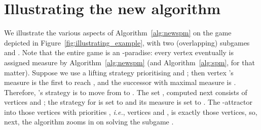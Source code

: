 \documentclass{eptcs}
\newcommand{\ie}{\emph{i.e.}\xspace}
\begin{document}
\section{Illustrating the new algorithm}
We illustrate the various aspects of Algorithm~\ref{alg:newspm} on
the game  depicted in Figure~\ref{fig:illustrating_example}, with two (overlapping) subgames
 and .
Note that the entire game is an -paradise: every vertex
eventually is assigned measure  by Algorithm~\ref{alg:newspm}
(and Algorithm~\ref{alg:spm}, for that matter). Suppose we use a
lifting strategy prioritising  and ; then vertex
's measure is the first to reach , and the successor
with maximal measure is . Therefore, 's strategy is to
move from  to .  The set , computed next consists of
vertices  and ; the strategy for  is set to 
and its measure is set to . The -attractor into those
vertices with priorities , \ie, vertices
 and , is exactly those vertices, so, next, the algorithm
zooms in on solving the subgame .
\end{document}
